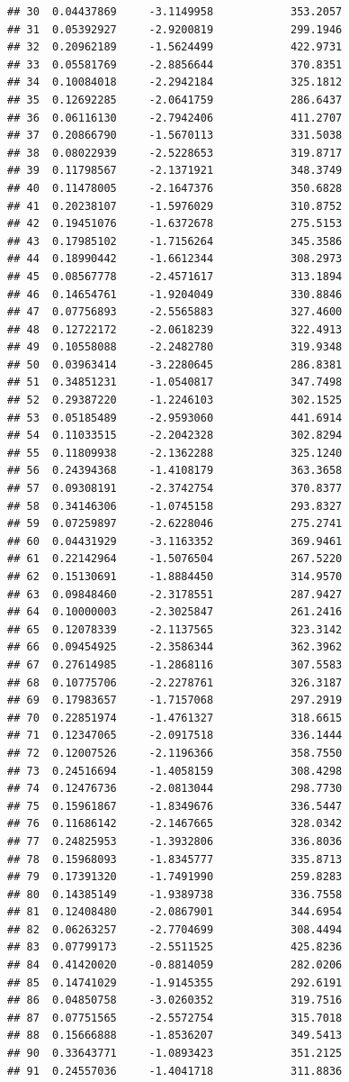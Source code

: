 \documentclass[]{article}
\begin{document}
\begin{verbatim}
## 30  0.04437869     -3.1149958            353.2057
## 31  0.05392927     -2.9200819            299.1946
## 32  0.20962189     -1.5624499            422.9731
## 33  0.05581769     -2.8856644            370.8351
## 34  0.10084018     -2.2942184            325.1812
## 35  0.12692285     -2.0641759            286.6437
## 36  0.06116130     -2.7942406            411.2707
## 37  0.20866790     -1.5670113            331.5038
## 38  0.08022939     -2.5228653            319.8717
## 39  0.11798567     -2.1371921            348.3749
## 40  0.11478005     -2.1647376            350.6828
## 41  0.20238107     -1.5976029            310.8752
## 42  0.19451076     -1.6372678            275.5153
## 43  0.17985102     -1.7156264            345.3586
## 44  0.18990442     -1.6612344            308.2973
## 45  0.08567778     -2.4571617            313.1894
## 46  0.14654761     -1.9204049            330.8846
## 47  0.07756893     -2.5565883            327.4600
## 48  0.12722172     -2.0618239            322.4913
## 49  0.10558088     -2.2482780            319.9348
## 50  0.03963414     -3.2280645            286.8381
## 51  0.34851231     -1.0540817            347.7498
## 52  0.29387220     -1.2246103            302.1525
## 53  0.05185489     -2.9593060            441.6914
## 54  0.11033515     -2.2042328            302.8294
## 55  0.11809938     -2.1362288            325.1240
## 56  0.24394368     -1.4108179            363.3658
## 57  0.09308191     -2.3742754            370.8377
## 58  0.34146306     -1.0745158            293.8327
## 59  0.07259897     -2.6228046            275.2741
## 60  0.04431929     -3.1163352            369.9461
## 61  0.22142964     -1.5076504            267.5220
## 62  0.15130691     -1.8884450            314.9570
## 63  0.09848460     -2.3178551            287.9427
## 64  0.10000003     -2.3025847            261.2416
## 65  0.12078339     -2.1137565            323.3142
## 66  0.09454925     -2.3586344            362.3962
## 67  0.27614985     -1.2868116            307.5583
## 68  0.10775706     -2.2278761            326.3187
## 69  0.17983657     -1.7157068            297.2919
## 70  0.22851974     -1.4761327            318.6615
## 71  0.12347065     -2.0917518            336.1444
## 72  0.12007526     -2.1196366            358.7550
## 73  0.24516694     -1.4058159            308.4298
## 74  0.12476736     -2.0813044            298.7730
## 75  0.15961867     -1.8349676            336.5447
## 76  0.11686142     -2.1467665            328.0342
## 77  0.24825953     -1.3932806            336.8036
## 78  0.15968093     -1.8345777            335.8713
## 79  0.17391320     -1.7491990            259.8283
## 80  0.14385149     -1.9389738            336.7558
## 81  0.12408480     -2.0867901            344.6954
## 82  0.06263257     -2.7704699            308.4494
## 83  0.07799173     -2.5511525            425.8236
## 84  0.41420020     -0.8814059            282.0206
## 85  0.14741029     -1.9145355            292.6191
## 86  0.04850758     -3.0260352            319.7516
## 87  0.07751565     -2.5572754            315.7018
## 88  0.15666888     -1.8536207            349.5413
## 90  0.33643771     -1.0893423            351.2125
## 91  0.24557036     -1.4041718            311.8836
\end{verbatim}
\end{document}
